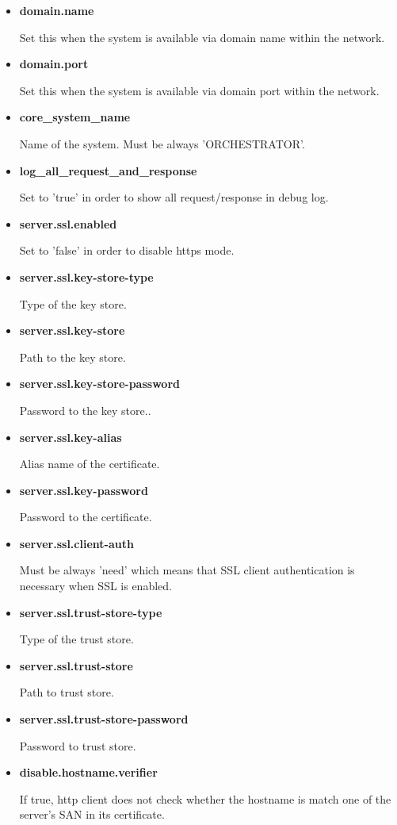 \documentclass[a4paper]{arrowhead}
\begin{document}
\begin{itemize}
  \item \textbf{domain.name}
  
  Set this when the system is available via domain name within the network.
  
  \item \textbf{domain.port}
  
  Set this when the system is available via domain port within the network.

  \item \textbf{core\_system\_name}
  
  Name of the system. Must be always 'ORCHESTRATOR'.
  
  \item \textbf{log\_all\_request\_and\_response}
  
  Set to 'true' in order to show all request/response in debug log.
  
  \item \textbf{server.ssl.enabled}
  
  Set to 'false' in order to disable https mode.
  
  \item \textbf{server.ssl.key-store-type}
  
  Type of the key store.
  
  \item \textbf{server.ssl.key-store}
  
  Path to the key store.
  
  \item \textbf{server.ssl.key-store-password}
  
  Password to the key store..
  
  \item \textbf{server.ssl.key-alias}
  
  Alias name of the certificate.
  
  \item \textbf{server.ssl.key-password}
  
  Password to the certificate.
  
  \item \textbf{server.ssl.client-auth}
  
  Must be always 'need' which means that SSL client authentication is necessary when SSL is enabled.
  
  \item \textbf{server.ssl.trust-store-type}
  
  Type of the trust store.
  
  \item \textbf{server.ssl.trust-store}
  
  Path to trust store.
  
  \item \textbf{server.ssl.trust-store-password}
  
  Password to trust store.
  
  \item \textbf{disable.hostname.verifier}
  
  If true, http client does not check whether the hostname is match one of the server's SAN in its certificate.
  \end{itemize}
  
\end{document}
